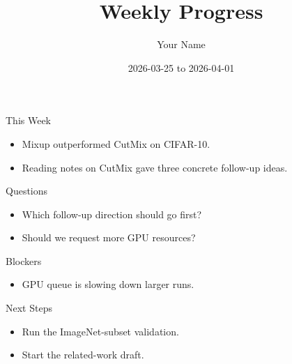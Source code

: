 \documentclass[aspectratio=169]{beamer}
\title{Weekly Progress}
\author{Your Name}
\date{2026-03-25 to 2026-04-01}
\begin{document}
\begin{frame}
\titlepage
\end{frame}

\begin{frame}{This Week}
\begin{itemize}
  \item Mixup outperformed CutMix on CIFAR-10.
  \item Reading notes on CutMix gave three concrete follow-up ideas.
\end{itemize}

\end{frame}

\begin{frame}{Questions}
\begin{itemize}
  \item Which follow-up direction should go first?
  \item Should we request more GPU resources?
\end{itemize}
\end{frame}

\begin{frame}{Blockers}
\begin{itemize}
  \item GPU queue is slowing down larger runs.
\end{itemize}
\end{frame}

\begin{frame}{Next Steps}
\begin{itemize}
  \item Run the ImageNet-subset validation.
  \item Start the related-work draft.
\end{itemize}
\end{frame}
\end{document}
